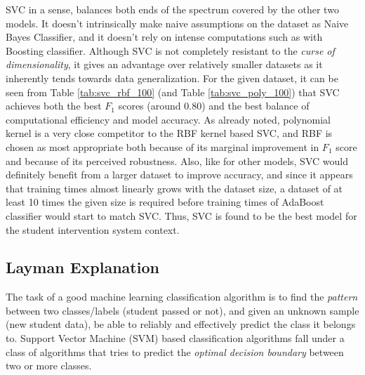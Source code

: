 \documentclass{article}
\begin{document}
	SVC in a sense, balances both ends of the spectrum covered by the other two models. It doesn't intrinsically make naive assumptions on the dataset as Naive Bayes Classifier, and it doesn't rely on intense computations such as with Boosting classifier. Although SVC is not completely resistant to the \emph{curse of dimensionality}, it gives an advantage over relatively smaller datasets as it inherently tends towards data generalization. For the given dataset, it can be seen from Table \ref{tab:svc_rbf_100} (and Table \ref{tab:svc_poly_100}) that SVC achieves both the best $F_1$ scores (around 0.80) and the best balance of computational efficiency and model accuracy. As already noted, polynomial kernel is a very close competitor to the RBF kernel based SVC, and RBF is chosen as most appropriate both because of its marginal improvement in $F_1$ score and because of its perceived robustness. Also, like for other models, SVC would definitely benefit from a larger dataset to improve accuracy, and since it appears that training times almost linearly grows with the dataset size, a dataset of at least 10 times the given size is required before training times of AdaBoost classifier would start to match SVC. Thus, SVC is found to be the best model for the student intervention system context.
	
	\subsection{Layman Explanation}
	The task of a good machine learning classification algorithm is to find the \emph{pattern} between two classes/labels (student passed or not), and given an unknown sample (new student data), be able to reliably and effectively predict the class it belongs to. Support Vector Machine (SVM) based classification algorithms fall under a class of algorithms that tries to predict the \emph{optimal decision boundary} between two or more classes.
	
\end{document}
